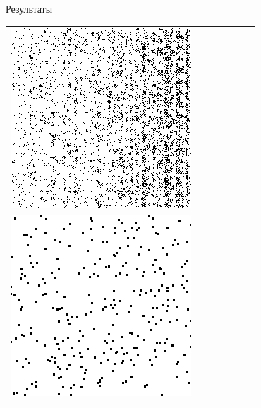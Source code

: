 \documentclass[12pt]{beamer}
\begin{document}
\begin{frame}{Результаты}
\begin{table}
\begin{center}
\begin{tabular}{p{1.2cm} p{1.2cm} p{1.2cm} p{1.2cm} p{1.2cm} p{1.2cm} p{1.2cm}}
					\includegraphics[width=1\linewidth]{8-results/sand-trend8/nf64e10/gen1}
					\\
					\includegraphics[width=1\linewidth]{8-results/sand-trend8/left2}

\end{tabular}
\end{center}
\end{table}
\end{frame}
\end{document}
